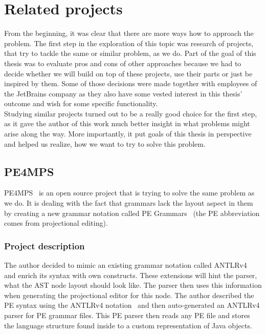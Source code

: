 \chapter{Related projects}
\label{chap:related_projects}

From the beginning, it was clear that there are more ways how to approach the problem.
The first step in the exploration of this topic was research of projects, that try to tackle the same or similar problem, as we do.
Part of the goal of this thesis was to evaluate pros and cons of other approaches because we had to decide whether we will build on top of these projects, use their parts or just be inspired by them.
Some of those decisions were made together with employees of the JetBrains company as they also have some vested interest in this thesis' outcome and wish for some specific functionality.
\\

Studying similar projects turned out to be a really good choice for the first step, as it gave the author of this work much better insight in what problems might arise along the way.
More importantly, it put goals of this thesis in perspective and helped us realize, how we want to try to solve this problem.

\section{PE4MPS}
\label{chap:pe4mps}
PE4MPS~\cite{PE4MPS} is an open source project that is trying to solve the same problem as we do.
It is dealing with the fact that grammars lack the layout aspect in them by creating a new grammar notation called PE Grammars~\cite{PE} (the PE abbreviation comes from projectional editing).

\subsection{Project description}
The author decided to mimic an existing grammar notation called ANTLRv4~\cite{ANTLR4} and enrich its syntax with own constructs.
These extensions will hint the parser, what the AST node layout should look like.
The parser then uses this information when generating the projectional editor for this node.
The author described the PE syntax using the ANTLRv4 notation~\cite{ANTLR4reference} and then auto-generated an ANTLRv4 parser for PE grammar files.
This PE parser then reads any PE file and stores the language structure found inside to a custom representation of Java objects.
\\

